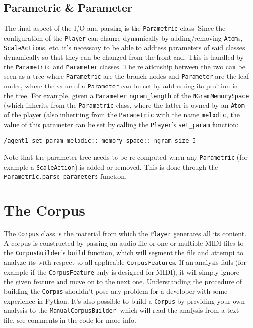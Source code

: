
\subsection{Parametric \& Parameter}\label{ssec:2-parameters}
The final aspect of the I/O and parsing is the \texttt{Parametric} class. Since the configuration of the \texttt{Player} can change dynamically by adding/removing \texttt{Atom}s, \texttt{ScaleAction}s, etc. it's necessary to be able to address parameters of said classes dynamically so that they can be changed from the front-end. This is handled by the \texttt{Parametric} and \texttt{Parameter} classes. The relationship between the two can be seen as a tree where \texttt{Parametric} are the branch nodes and \texttt{Parameter} are the leaf nodes, where the value of a \texttt{Parameter} can be set by addressing its position in the tree. For example, given a \texttt{Parameter} \texttt{ngram\_length} of the \texttt{NGramMemorySpace} (which inherits from the \texttt{Parametric} class, where the latter is owned by an \texttt{Atom} of the player (also inheriting from the \texttt{Parametric} with the name \texttt{melodic}, the value of this parameter can be set by calling the \texttt{Player}'s \texttt{set\_param} function:
\begin{lstlisting}
/agent1 set_param melodic::_memory_space::_ngram_size 3
\end{lstlisting}
Note that the parameter tree needs to be re-computed when any \texttt{Parametric} (for example a \texttt{ScaleAction}) is added or removed. This is done through the \\ \texttt{Parametric.parse\_parameters} function.



\section{The Corpus}\label{ssec:2-corpus}
The \texttt{Corpus} class is the material from which the \texttt{Player} generates all its content. A corpus is constructed by passing an audio file or one or multiple MIDI files to the \texttt{CorpusBuilder}'s \texttt{build} function, which will segment the file and attempt to analyze its with respect to all applicable \texttt{CorpusFeature}s. If an analysis fails (for example if the \texttt{CorpusFeature} only is designed for MIDI), it will simply ignore the given feature and move on to the next one. Understanding the procedure of building the \texttt{Corpus} shouldn't pose any problem for a developer with some experience in Python. It's also possible to build a \texttt{Corpus} by providing your own analysis to the \texttt{ManualCorpusBuilder}, which will read the analysis from a text file, see comments in the code for more info.

